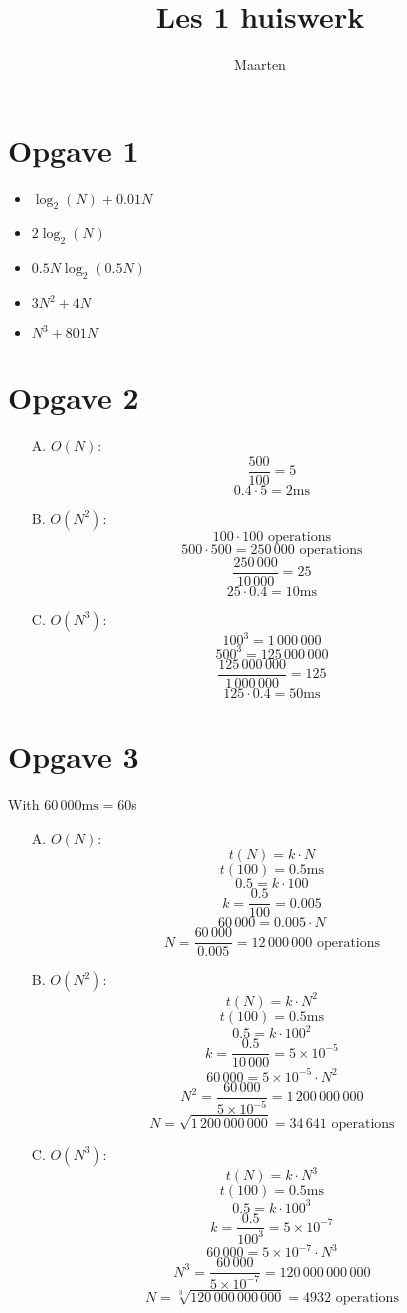\documentclass[12pt,a4paper]{article}
\title{Les 1 huiswerk}
\author{Maarten}
\begin{document}
\maketitle
\section{Opgave 1}
\begin{itemize}
\item $\log_2(N) + 0.01N$
\item $2\log_2(N)$
\item $0.5N \log_2(0.5N)$
\item $3N^2 + 4N$
\item $N^3 + 801N$

\end{itemize}
\section{Opgave 2}
\begin{itemize}
\item[A.] $O(N)$:
\[\frac{500}{100} = 5\]
\[0.4 \cdot 5 = 2 \text{ms}\]

\item[B.] $O(N^2)$:
\[100 \cdot 100 \text{ operations}\]
\[500 \cdot 500 = 250\,000 \text{ operations}\]
\[\frac{250\,000}{10\,000} = 25\]
\[25 \cdot 0.4 = 10\text{ms}\]

\item[C.] $O(N^3)$:
\[100^3 = 1\,000\,000\]
\[500^3 = 125\,000\,000\]
\[\frac{125\,000\,000}{1\,000\,000} = 125\]
\[125 \cdot 0.4 = 50\text{ms}\]

\end{itemize}
\section{Opgave 3}
With $60\,000\text{ms} = 60$s
\begin{itemize}
\item[A.] $O(N)$:
\[t(N) = k \cdot N\]
\[t(100) = 0.5\text{ms}\]
\[0.5 = k \cdot 100\]
\[k = \frac{0.5}{100} = 0.005\]
\[60\,000 = 0.005 \cdot N\]
\[N = \frac{60\,000}{0.005} = 12\,000\,000 \text{ operations}\]

\item[B.] $O(N^2)$:
\[t(N) = k \cdot N^2\]
\[t(100) = 0.5\text{ms}\]
\[0.5 = k \cdot 100^2\]
\[k = \frac{0.5}{10\,000} = 5 \times 10^{-5}\]
\[60\,000 = 5 \times 10^{-5} \cdot N^2\]
\[N^2 = \frac{60\,000}{5 \times 10^{-5}} = 1\,200\,000\,000\]
\[N = \sqrt{1\,200\,000\,000} = 34\,641 \text{ operations}\]

\item[C.] $O(N^3)$:
\[t(N) = k \cdot N^3\]
\[t(100) = 0.5\text{ms}\]
\[0.5 = k \cdot 100^3\]
\[k = \frac{0.5}{100^3} = 5 \times 10^{-7} \]
\[60\,000 = 5 \times 10^{-7} \cdot N^3\]
\[N^3 = \frac{60\,000}{5 \times 10^{-7}} = 120\,000\,000\,000\]
\[N = \sqrt[3]{120\,000\,000\,000} = 4932 \text{ operations}\]

\end{itemize}
\end{document}
